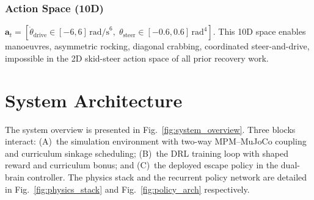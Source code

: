 \documentclass[conference]{IEEEtran}
\begin{document}
\subsubsection{Action Space (10D)}

$\mathbf{a}_t = [\dot{\theta}_{\text{drive}} \in [-6,6]\,\text{rad/s}^6,\;
\theta_{\text{steer}} \in [-0.6,0.6]\,\text{rad}^4]$.
This 10D space enables manoeuvres, asymmetric rocking, diagonal crabbing,
coordinated steer-and-drive, impossible in the 2D skid-steer action space of
all prior recovery work.

\section{System Architecture}
\label{sec:architecture}

The system overview is presented in Fig.~\ref{fig:system_overview}. Three blocks
interact: (A)~the simulation environment with two-way MPM--MuJoCo coupling and
curriculum sinkage scheduling; (B)~the DRL training loop with shaped reward and
curriculum bonus; and (C)~the deployed escape policy in the dual-brain controller.
The physics stack and the recurrent policy network are detailed in
Fig.~\ref{fig:physics_stack} and Fig.~\ref{fig:policy_arch} respectively.
\end{document}
